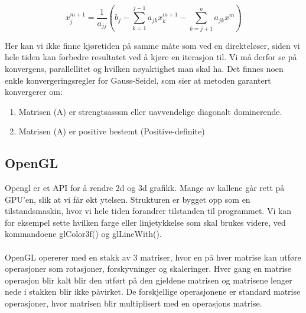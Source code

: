 \documentclass[10pt,a4paper, norsk]{article}
\begin{document}
 \begin{equation} \label{seideliterater}
   x_j^{m+1} = \frac{1}{a_{jj}}  (b_j - \sum_{k=1}^{j-1} a_{jk} x_k^{m+1} - \sum_{k=j+1}^n a_{jk}x^m)
 \end{equation}

Her kan vi ikke finne kjøretiden på samme måte som ved en direkteløser, siden vi hele tiden kan forbedre resultatet ved å kjøre en iterasjon til. Vi må derfor se på konvergens, parallellitet og hvilken nøyaktighet man skal ha. Det finnes noen enkle konvergeringsregler for Gauss-Seidel, som sier at metoden garantert konvergerer om:
\begin{enumerate}
\item Matrisen (A) er strengtsasssm eller uavvendelige diagonalt dominerende.
\item Matrisen (A) er positive bestemt (Positive-definite)
\end{enumerate}



\subsection{OpenGL}
Opengl er et API for å rendre 2d og 3d grafikk. Mange av kallene går rett på GPU'en, slik at vi får økt ytelsen. Strukturen er bygget opp som en tilstandsmaskin, hvor vi hele tiden forandrer tilstanden til programmet. Vi kan for eksempel sette hvilken farge eller linjetykkelse som skal brukes videre, ved kommandoene glColor3f() og glLineWith().

\paragraph{}
OpenGL opererer med en stakk av 3 matriser, hvor en på hver matrise kan utføre operasjoner som rotasjoner, forskyvninger og skaleringer. Hver gang en matrise operasjon blir kalt blir den utført på den gjeldene matrisen og matrisene lenger nede i stakken blir ikke påvirket. De forskjellige operasjonene er standard matrise operasjoner, hvor matrisen blir multiplisert med en operasjons matrise.
\end{document}
